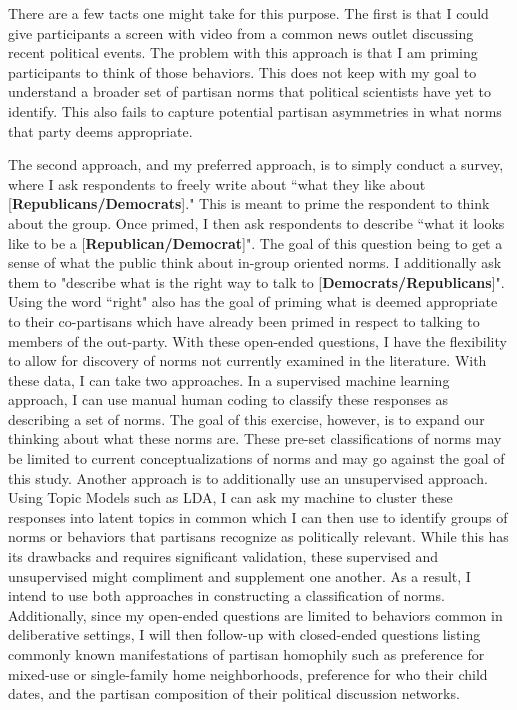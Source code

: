 \documentclass [12pt]{article}
\begin{document}
There are a few tacts one might take for this purpose. The first is that I could give participants a screen with video from a common news outlet discussing recent political events. The problem with this approach is that I am priming participants to think of those behaviors. This does not keep with my goal to understand a broader set of partisan norms that political scientists have yet to identify. This also fails to capture potential partisan asymmetries in what norms that party deems appropriate. 

The second approach, and my preferred approach, is to simply conduct a survey, where I ask respondents to freely write about ``what they like about [\textbf{Republicans/Democrats}]." This is meant to prime the respondent to think about the group. Once primed, I then ask respondents to describe ``what it looks like to be a [\textbf{Republican/Democrat}]". The goal of this question being to get a sense of what the public think about in-group oriented norms. I additionally ask them to "describe what is the right way to talk to [\textbf{Democrats/Republicans}]". Using the word ``right" also has the goal of priming what is deemed appropriate to their co-partisans which have already been primed in respect to talking to members of the out-party. With these open-ended questions, I have the flexibility to allow for discovery of norms not currently examined in the literature. With these data, I can take two approaches. In a supervised machine learning approach, I can use manual human coding to classify these responses as describing a set of norms. The goal of this exercise, however, is to expand our thinking about what these norms are. These pre-set classifications of norms may be limited to current conceptualizations of norms and may go against the goal of this study. Another approach is to additionally use an unsupervised approach. Using Topic Models such as LDA, I can ask my machine to cluster these responses into latent topics in common which I can then use to identify groups of norms or behaviors that partisans recognize as politically relevant. While this has its drawbacks and requires significant validation, these supervised and unsupervised might compliment and supplement one another. As a result, I intend to use both approaches in constructing a classification of norms. Additionally, since my open-ended questions are limited to behaviors common in deliberative settings, I will then follow-up with closed-ended questions listing commonly known manifestations of partisan homophily such as preference for mixed-use or single-family home neighborhoods, preference for who their child dates, and the partisan composition of their political discussion networks. 
\end{document}
